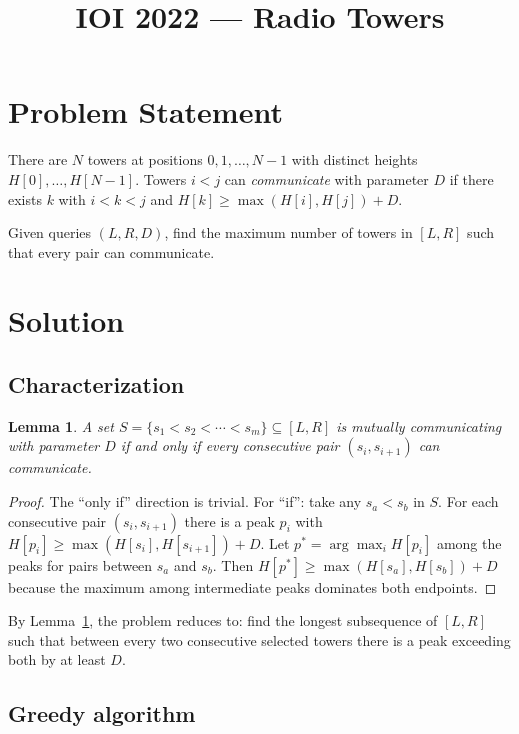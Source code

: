 \documentclass[11pt,a4paper]{article}
\title{IOI 2022 --- Radio Towers}
\author{}
\date{}
\newtheorem{lemma}[theorem]{Lemma}
\begin{document}
\maketitle

\section{Problem Statement}

There are $N$ towers at positions $0, 1, \ldots, N{-}1$ with distinct
heights $H[0], \ldots, H[N{-}1]$.  Towers $i < j$ can
\emph{communicate} with parameter $D$ if there exists $k$ with
$i < k < j$ and $H[k] \ge \max(H[i], H[j]) + D$.

Given queries $(L, R, D)$, find the maximum number of towers in $[L, R]$
such that every pair can communicate.

\section{Solution}

\subsection{Characterization}

\begin{lemma}\label{lem:consec}
A set $S = \{s_1 < s_2 < \cdots < s_m\} \subseteq [L,R]$ is mutually
communicating with parameter $D$ if and only if every \emph{consecutive}
pair $(s_i, s_{i+1})$ can communicate.
\end{lemma}

\begin{proof}
The ``only if'' direction is trivial.  For ``if'': take any $s_a < s_b$
in $S$.  For each consecutive pair $(s_i, s_{i+1})$ there is a peak
$p_i$ with $H[p_i] \ge \max(H[s_i], H[s_{i+1}]) + D$.  Let
$p^* = \arg\max_i H[p_i]$ among the peaks for pairs between $s_a$ and
$s_b$.  Then $H[p^*] \ge \max(H[s_a], H[s_b]) + D$ because the maximum
among intermediate peaks dominates both endpoints.
\end{proof}

By Lemma~\ref{lem:consec}, the problem reduces to: find the longest
subsequence of $[L,R]$ such that between every two consecutive selected
towers there is a peak exceeding both by at least $D$.

\subsection{Greedy algorithm}
\end{document}
